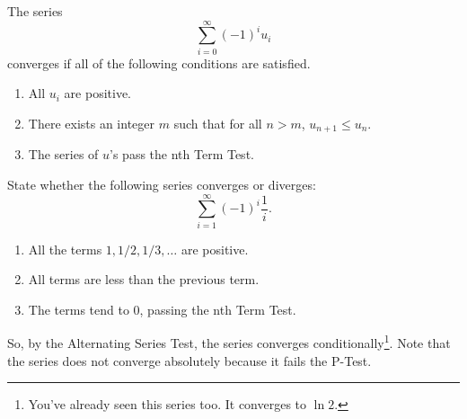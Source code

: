 \begin{lemma}
	The series
	\begin{equation*}
		\sum_{i=0}^{\infty}{(-1)^iu_i}
	\end{equation*}
	converges if all of the following conditions are satisfied.
	\begin{enumerate}
		\item All $u_i$ are positive.
		\item There exists an integer $m$ such that for all $n > m$, $u_{n+1} \leq u_n$.
		\item The series of $u$'s pass the nth Term Test.
	\end{enumerate}
\end{lemma}

\begin{example}
	State whether the following series converges or diverges:
	\begin{equation*}
		\sum_{i=1}^{\infty}{(-1)^i\frac{1}{i}}.
	\end{equation*}
\end{example}
\begin{enumerate}
	\item All the terms $1, 1/2, 1/3, \ldots$ are positive.
	\item All terms are less than the previous term.
	\item The terms tend to 0, passing the nth Term Test.
\end{enumerate}
\indent
So, by the Alternating Series Test, the series converges conditionally\footnote{You've already seen this series too. It converges to $\ln{2}$.}.
Note that the series does not converge absolutely because it fails the P-Test. \\